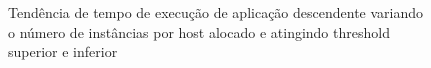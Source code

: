 \documentclass[twoside,english,brazilian]{UNISINOSartigo}
\begin{document}
\begin{figure}
\\
\vspace{-0.5\baselineskip}
\\
\caption{Tendência de tempo de execução de aplicação descendente variando o número de instâncias por host alocado e atingindo threshold superior e inferior}
\label{fig:trend_des}
\end{figure}
\end{document}
